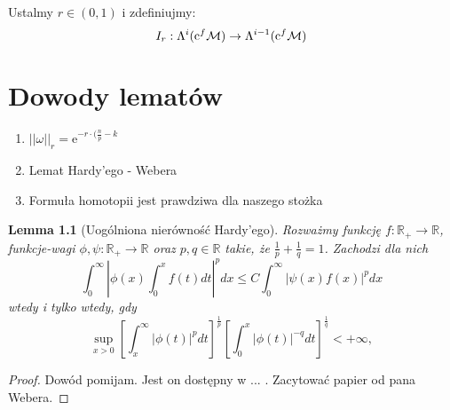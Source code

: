 \documentclass[licencjacka]{pracamgr}
\theoremstyle{definition}
\theoremstyle{definition}
\theoremstyle{plain}
\newtheorem{lemma}{Lemma}[section]
\theoremstyle{plain}
\def\cfm{\ensuremath\mathrm{c}^f\mathcal{M}}
\begin{document}
Ustalmy $r \in (0, 1)$ i zdefiniujmy:
\[
    I_r: \Lambda^i(\cfm) \rightarrow \Lambda^{i-1}(\cfm)
\]



\chapter{Dowody lematów}


\begin{enumerate}
    \item $||\omega||_r = \mathrm{e}^{-r \cdot (\frac{n}{p} - k }  $
    \item Lemat Hardy'ego - Webera
    \item Formuła homotopii jest prawdziwa dla naszego stożka
\end{enumerate}




\begin{lemma}[Uogólniona nierówność Hardy'ego]
    Rozważmy funkcję $f: \mathbb{R}_{+} \rightarrow \mathbb{R}$, funkcje-wagi
    $\phi, \psi: \mathbb{R}_{+} \rightarrow \mathbb{R}$ oraz $p, q \in
    \mathbb{R}$ takie, że $\frac{1}{p} + \frac{1}{q} = 1 $.  Zachodzi dla nich
$$
\int_0^\infty \left|
                \phi(x) \int_0^x f(t) dt
              \right|^p dx
\leq
C \int_0^\infty \left|
                    \psi(x)  f(x)
                \right|^p dx
$$
wtedy i tylko wtedy, gdy
$$
\sup_{x > 0}
\left[
\int_x^\infty  
   | \phi(t) |^p dt
\right]^{\frac{1}{p}}
\left[
\int_0^x
    | \phi(t) |^{-q} dt
\right]^{\frac{1}{q}} < + \infty,
$$
\end{lemma}
\begin{proof}
    Dowód pomijam. 
    Jest on dostępny w ... . Zacytować papier od pana Webera.
\end{proof}
\end{document}
